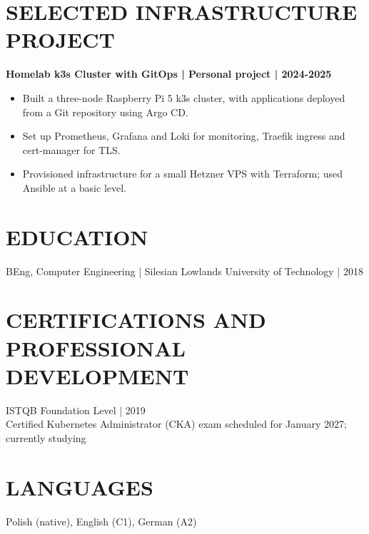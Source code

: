 \documentclass[11pt,a4paper]{article}
\begin{document}
\section*{SELECTED INFRASTRUCTURE PROJECT}
\textbf{Homelab k3s Cluster with GitOps | Personal project | 2024-2025}
\begin{itemize}
\item Built a three-node Raspberry Pi 5 k3s cluster, with applications deployed from a Git repository using Argo CD.
\item Set up Prometheus, Grafana and Loki for monitoring, Traefik ingress and cert-manager for TLS.
\item Provisioned infrastructure for a small Hetzner VPS with Terraform; used Ansible at a basic level.
\end{itemize}

\section*{EDUCATION}
BEng, Computer Engineering | Silesian Lowlands University of Technology | 2018

\section*{CERTIFICATIONS AND PROFESSIONAL DEVELOPMENT}
ISTQB Foundation Level | 2019\\
Certified Kubernetes Administrator (CKA) exam scheduled for January 2027; currently studying

\section*{LANGUAGES}
Polish (native), English (C1), German (A2)
\end{document}
